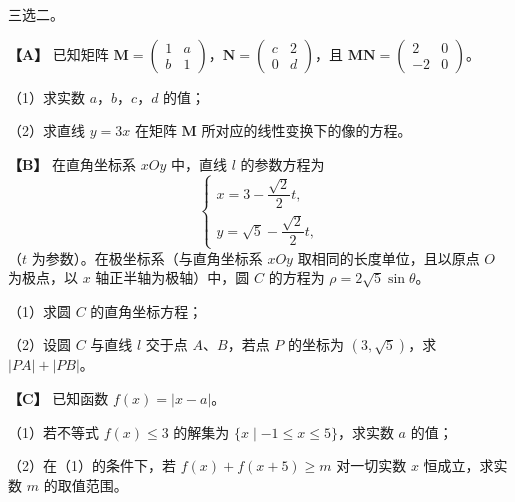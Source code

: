 \begin{question}
三选二。

\textbf{【A】} 已知矩阵 $\boldsymbol M=\begin{pmatrix}1&a\\b&1\end{pmatrix}$，$\boldsymbol N=\begin{pmatrix}c&2\\0&d\end{pmatrix}$，且 $\boldsymbol M\boldsymbol N=\begin{pmatrix}2&0\\-2&0\end{pmatrix}$。

（1）求实数 $a$，$b$，$c$，$d$ 的值；

（2）求直线 $y=3x$ 在矩阵 $\boldsymbol M$ 所对应的线性变换下的像的方程。

\textbf{【B】} 在直角坐标系 $xOy$ 中，直线 $l$ 的参数方程为
\nopagebreak[4]
\[\begin{cases}x=3-\dfrac{\sqrt2}{2}t,\\y=\sqrt5-\dfrac{\sqrt2}{2}t,\end{cases}\]
（$t$ 为参数）。在极坐标系（与直角坐标系 $xOy$ 取相同的长度单位，且以原点 $O$ 为极点，以 $x$ 轴正半轴为极轴）中，圆 $C$ 的方程为 $\rho=2\sqrt5\sin\theta$。

（1）求圆 $C$ 的直角坐标方程；

（2）设圆 $C$ 与直线 $l$ 交于点 $A$、$B$，若点 $P$ 的坐标为 $(3,\sqrt5)$，求 $|PA|+|PB|$。

\vspace{0.8\baselineskip}
\textbf{【C】} 已知函数 $f(x)=|x-a|$。

（1）若不等式 $f(x)\leqslant3$ 的解集为 $\{x\mid-1\leqslant x\leqslant5\}$，求实数 $a$ 的值；

（2）在（1）的条件下，若 $f(x)+f(x+5)\geqslant m$ 对一切实数 $x$ 恒成立，求实数 $m$ 的取值范围。

\end{question}